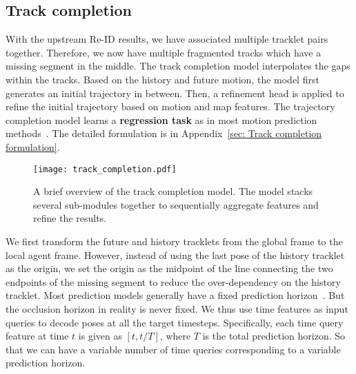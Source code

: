\documentclass{article} \usepackage{iclr2023_conference,times}
\begin{document}
\subsection{Track completion}
\vspace{-1mm}
\label{sec: track completion}
With the upstream Re-ID results, we have associated multiple tracklet pairs together. Therefore, we now have multiple fragmented tracks which have a missing segment in the middle. The track completion model interpolates the gaps within the tracks. Based on the history and future motion, the model first generates an initial trajectory in between. Then, a refinement head is applied to refine the initial trajectory based on motion and map features. The trajectory completion model learns a \textbf{regression task} as in most motion prediction methods~\cite{laneGCN,PGP}. The detailed formulation is in Appendix~\ref{sec: Track completion formulation}.

\begin{figure*}[htb]
\centering
\texttt{[image: track\_completion.pdf]}
\caption{A brief overview of the track completion model. The model stacks several sub-modules together to sequentially aggregate features and refine the results.  }
\label{fig: track completion}

\end{figure*}

We first transform the future and history tracklets from the global frame to the local agent frame. However, instead of using the last pose of the history tracklet as the origin, we set the origin as the midpoint of the line connecting the two endpoints of the missing segment to reduce the over-dependency on the history tracklet. 
Most prediction models generally have a fixed prediction horizon~\cite{laneGCN,PGP}. But the occlusion horizon in reality is never fixed. We thus use time features as input queries to decode poses at all the target timesteps. Specifically, each time query feature at time $t$ is given as $\left[t, t/T \right]$, where $T$ is the total prediction horizon. So that we can have a variable number of time queries corresponding to a variable prediction horizon. 
\end{document}
